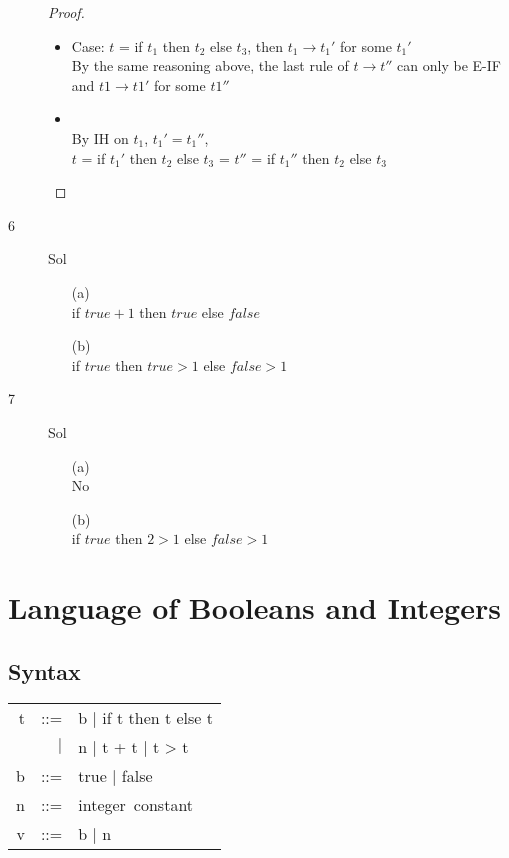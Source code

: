 \documentclass{article}
\begin{document}
\begin{description}
\begin{proof}
\begin{itemize}
                \item Case: $t$ = if $t_1$ then $t_2$ else $t_3$, then $t_1 \rightarrow t_1'$ for some $t_1'$ \\
                    By the same reasoning above, the last rule of $t \rightarrow t''$ can only be E-IF and $t1 \rightarrow t1'$ for some $t1''$
                \item \\ By IH on $t_1$, $t_1' = t_1''$,\\  $t$ = if $t_1'$ then $t_2$ else $t_3$ = $t''$ = if $t_1''$ then $t_2$ else $t_3$

            \end{itemize}
        \end{proof}
        \item[6] {Sol}\\
            \begin{enumerate}
                \item[(a)] \\
                 if $true + 1$ then $true$ else $false$
                \item[(b)] \\
                if $true$ then $true>1$ else $false>1$
            \end{enumerate}
        \item[7] {Sol} \\
                \begin{enumerate}
                     \item[(a)] \\
                     No
                     \item[(b)] \\
                     if $true$ then $2>1$ else $false>1$
                \end{enumerate}


    \end{description}

    \section{Language of Booleans and Integers}

    \subsection{Syntax}

    \begin{tt}
        \begin{tabular}{rrl}
            t & ::= & b $\mid$ if t then t else t \\
            &$\mid$& n $\mid$ t + t $\mid$ t > t \\
            b & ::= & true $\mid$ false \\
            n & ::= & \mbox{\rm integer constant} \\
            v & ::= & b $\mid$ n \\
        \end{tabular}
    \end{tt}
\end{document}
